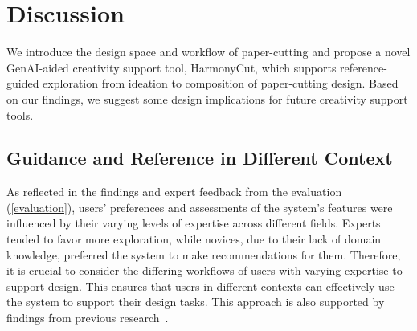 \section{Discussion}

We introduce the design space and workflow of paper-cutting and propose a novel GenAI-aided creativity support tool, HarmonyCut, which supports reference-guided exploration from ideation to composition of paper-cutting design. Based on our findings, we suggest some design implications for future creativity support tools.


\subsection{Guidance and Reference in Different Context}\label{discussion:guidance reference}
As reflected in the findings and expert feedback from the evaluation (\autoref{evaluation}), users' preferences and assessments of the system's features were influenced by their varying levels of expertise across different fields. Experts tended to favor more exploration, while novices, due to their lack of domain knowledge, preferred the system to make recommendations for them. Therefore, it is crucial to consider the differing workflows of users with varying expertise to support design. This ensures that users in different contexts can effectively use the system to support their design tasks. This approach is also supported by findings from previous research~\cite{Xiao:2024:typedance, Zhou:2023:filtererink, Yan:2022:flatmagic}.

